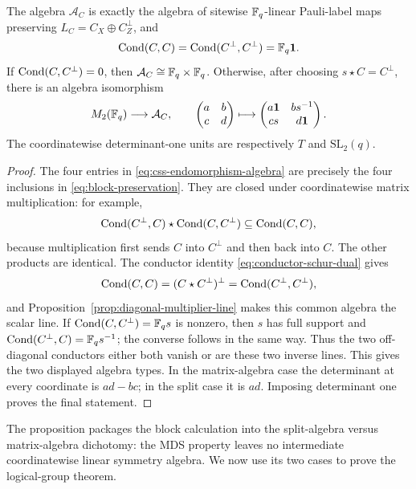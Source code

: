 \begin{proposition}
\label{prop:two-endomorphism-algebras}
The algebra \(\mathcal A_C\) is exactly the algebra of sitewise
\(\mathbb F_q\)-linear Pauli-label maps preserving
\(L_C=C_X\oplus C_Z^\perp\), and
\[
 \operatorname{Cond}(C,C)=\operatorname{Cond}(C^\perp,C^\perp)=\mathbb F_q\mathbf1.
\]
If \(\operatorname{Cond}(C,C^\perp)=0\), then
\(\mathcal A_C\cong\mathbb F_q\times\mathbb F_q\).  Otherwise, after choosing
\(s\star C=C^\perp\), there is an algebra isomorphism
\[
 M_2(\mathbb F_q)\longrightarrow\mathcal A_C,
 \qquad
 \begin{pmatrix}a&b\\c&d\end{pmatrix}
 \longmapsto
 \begin{pmatrix}a\mathbf1&b s^{-1}\\cs&d\mathbf1\end{pmatrix}.
\]
The coordinatewise determinant-one units are respectively \(T\) and
\(\mathrm{SL}_2(q)\).
\end{proposition}

\begin{proof}
The four entries in \eqref{eq:css-endomorphism-algebra} are precisely the
four inclusions in \eqref{eq:block-preservation}.  They are closed under
coordinatewise matrix multiplication: for example,
\[
 \operatorname{Cond}(C^\perp,C)\star\operatorname{Cond}(C,C^\perp)\subseteq\operatorname{Cond}(C,C),
\]
because multiplication first sends \(C\) into \(C^\perp\) and then back
into \(C\).  The other products are identical.  The conductor identity
\eqref{eq:conductor-schur-dual} gives
\[
 \operatorname{Cond}(C,C)=(C\star C^\perp)^\perp
 =\operatorname{Cond}(C^\perp,C^\perp),
\]
and Proposition~\ref{prop:diagonal-multiplier-line} makes this common algebra
the scalar line.  If \(\operatorname{Cond}(C,C^\perp)=\mathbb F_qs\) is nonzero, then \(s\) has
full support and \(\operatorname{Cond}(C^\perp,C)=\mathbb F_qs^{-1}\); the converse follows in
the same way.  Thus the two off-diagonal conductors either both vanish or are
these two inverse lines.  This gives the two displayed algebra types.  In the
matrix-algebra case the determinant at every coordinate is \(ad-bc\); in the
split case it is \(ad\).  Imposing determinant one proves the final statement.
\end{proof}

The proposition packages the block calculation into the split-algebra versus
matrix-algebra dichotomy: the MDS property leaves no intermediate
coordinatewise linear symmetry algebra.  We now use its two cases to prove the
logical-group theorem.

